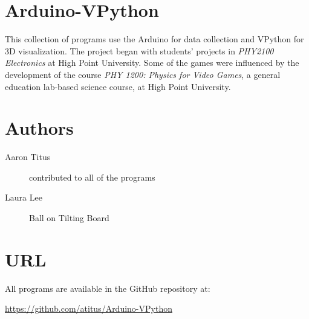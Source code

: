 \documentclass[10pt]{article}
\begin{document}
\section{Arduino-VPython}

This collection of programs use the Arduino for data collection and VPython for 3D visualization. The project began with students' projects in \emph{PHY2100 Electronics} at High Point University. Some of the games were influenced by the development of the course \emph{PHY 1200: Physics for Video Games}, a general education lab-based science course, at High Point University.

\section{Authors}

\begin{description}
	\item[Aaron Titus] contributed to all of the programs
	\item[Laura Lee]  Ball on Tilting Board
\end{description}



\section{URL}

All programs are available in the GitHub repository at:

\bigskip

\url{https://github.com/atitus/Arduino-VPython}
\end{document}
